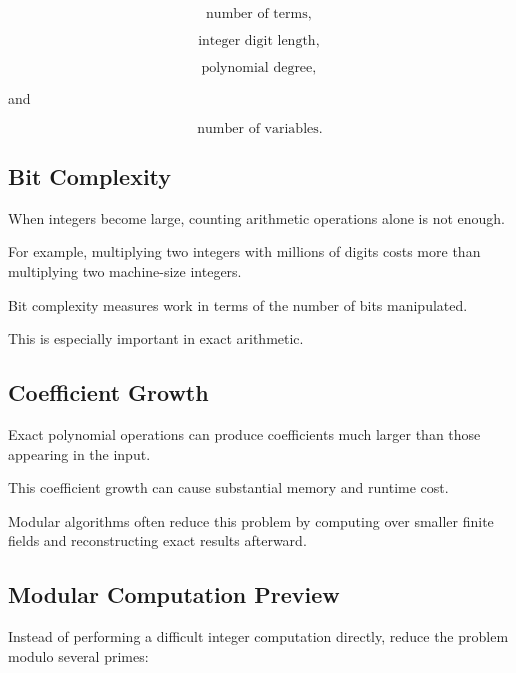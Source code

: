 \[
\boxed{
\text{number of terms},
}
\]

\[
\boxed{
\text{integer digit length},
}
\]

\[
\boxed{
\text{polynomial degree},
}
\]

and

\[
\boxed{
\text{number of variables}.
}
\]

\subsection{Bit Complexity}
\label{subsec:symbolic-bit-complexity}

When integers become large, counting arithmetic operations alone is not
enough.

For example, multiplying two integers with millions of digits costs more
than multiplying two machine-size integers.

Bit complexity measures work in terms of the number of bits manipulated.

This is especially important in exact arithmetic.

\subsection{Coefficient Growth}
\label{subsec:coefficient-growth-symbolic}

Exact polynomial operations can produce coefficients much larger than
those appearing in the input.

This coefficient growth can cause substantial memory and runtime cost.

Modular algorithms often reduce this problem by computing over smaller
finite fields and reconstructing exact results afterward.

\subsection{Modular Computation Preview}
\label{subsec:modular-computation-preview}

Instead of performing a difficult integer computation directly, reduce the
problem modulo several primes:

